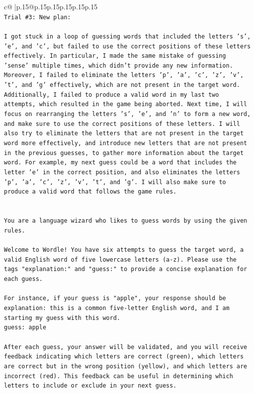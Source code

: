 \documentclass{article}
\begin{document}
{\begin{supertabular}{c@{$\;$}|p{.15\linewidth}@{}p{.15\linewidth}p{.15\linewidth}p{.15\linewidth}p{.15\linewidth}p{.15\linewidth}}
{{{\\ 
\texttt{Trial \#3: New plan: } \\
\\ 
\texttt{I got stuck in a loop of guessing words that included the letters 's', 'e', and 'c', but failed to use the correct positions of these letters effectively. In particular, I made the same mistake of guessing 'sense' multiple times, which didn't provide any new information. Moreover, I failed to eliminate the letters 'p', 'a', 'c', 'z', 'v', 't', and 'g' effectively, which are not present in the target word. Additionally, I failed to produce a valid word in my last two attempts, which resulted in the game being aborted. Next time, I will focus on rearranging the letters 's', 'e', and 'n' to form a new word, and make sure to use the correct positions of these letters. I will also try to eliminate the letters that are not present in the target word more effectively, and introduce new letters that are not present in the previous guesses, to gather more information about the target word. For example, my next guess could be a word that includes the letter 'e' in the correct position, and also eliminates the letters 'p', 'a', 'c', 'z', 'v', 't', and 'g'. I will also make sure to produce a valid word that follows the game rules.} \\
\\ 
\\ 
\texttt{You are a language wizard who likes to guess words by using the given rules.} \\
\\ 
\texttt{Welcome to Wordle! You have six attempts to guess the target word, a valid English word of five lowercase letters (a{-}z). Please use the tags "explanation:" and "guess:" to provide a concise explanation for each guess.} \\
\\ 
\texttt{For instance, if your guess is "apple", your response should be} \\
\texttt{explanation: this is a common five{-}letter English word, and I am starting my guess with this word.} \\
\texttt{guess: apple} \\
\\ 
\texttt{After each guess, your answer will be validated, and you will receive feedback indicating which letters are correct (green), which letters are correct but in the wrong position (yellow), and which letters are incorrect (red). This feedback can be useful in determining which letters to include or exclude in your next guess.} \\
}}}
\end{supertabular}}
\end{document}

